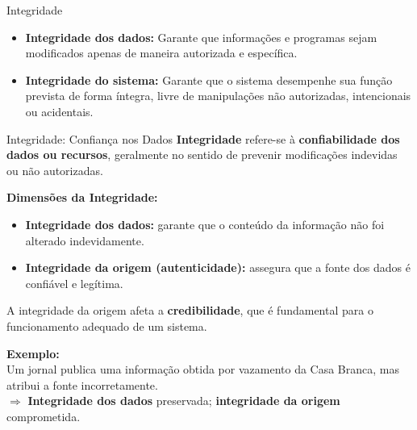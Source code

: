 \begin{frame}{Integridade}

    \begin{itemize}
        \item \textbf{Integridade dos dados:} Garante que informações e programas sejam modificados apenas de maneira autorizada e específica.
        \item \textbf{Integridade do sistema:} Garante que o sistema desempenhe sua função prevista de forma íntegra, livre de manipulações não autorizadas, intencionais ou acidentais.
    \end{itemize}

\end{frame}
\begin{frame}{Integridade: Confiança nos Dados}
    \textbf{Integridade} refere-se à \textbf{confiabilidade dos dados ou recursos}, geralmente no sentido de prevenir modificações indevidas ou não autorizadas.

    \vspace{0.3cm}
    \textbf{Dimensões da Integridade:}
    \begin{itemize}
        \item \textbf{Integridade dos dados:} garante que o conteúdo da informação não foi alterado indevidamente.
        \item \textbf{Integridade da origem (autenticidade):} assegura que a fonte dos dados é confiável e legítima.
    \end{itemize}

    \vspace{0.3cm}
    A integridade da origem afeta a \textbf{credibilidade}, que é fundamental para o funcionamento adequado de um sistema.

    \vspace{0.3cm}
    \textbf{Exemplo:} \\
    Um jornal publica uma informação obtida por vazamento da Casa Branca, mas atribui a fonte incorretamente. \\
    $\Rightarrow$ \textbf{Integridade dos dados} preservada; \textbf{integridade da origem} comprometida.
\end{frame}

